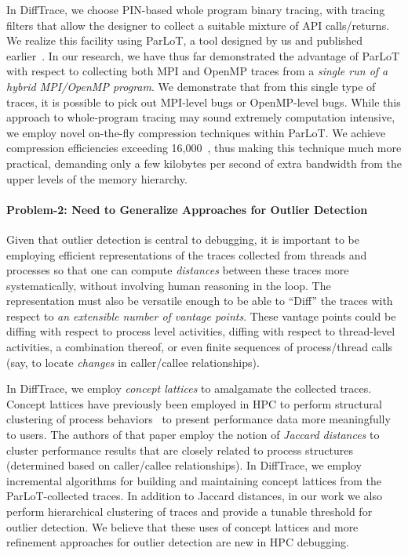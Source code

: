 In DiffTrace, we choose PIN-based whole program binary tracing, with
tracing filters that allow the designer to collect a suitable mixture of API
calls/returns.
%
We realize this facility using
ParLoT, a tool designed by us and published earlier~\cite{parlot-paper}.
%
In our research, we have thus far demonstrated the advantage of
ParLoT with respect to collecting both MPI and OpenMP traces
from a {\em single run of a hybrid MPI/OpenMP program}.
%
We demonstrate that from this single type of traces, it is possible
to pick out MPI-level bugs or OpenMP-level bugs.
%
While this approach to whole-program tracing
may sound extremely computation intensive, we employ
novel on-the-fly compression techniques within ParLoT.
%
We achieve compression efficiencies exceeding 16,000~\cite{parlot-paper},
thus making this technique much more practical, demanding
only a few kilobytes per second of extra bandwidth from the upper levels of
the memory hierarchy.


\paragraph{Problem-2: Need to Generalize Approaches for Outlier Detection\/}
Given that outlier detection is central to debugging,
it is important to be employing efficient representations of the traces
collected from threads and processes so that one can compute
{\em distances} between these traces more systematically, without
involving human reasoning in the loop.
%
The representation must also be versatile enough to
be able to ``Diff'' the traces
with respect to {\em an extensible number of vantage points}.
%
These vantage points could be diffing with respect to process level activities,
diffing with respect to thread-level activities, a combination thereof,
or even finite sequences of process/thread calls (say, to locate {\em changes}
in caller/callee relationships).


In DiffTrace, we employ {\em concept lattices} to amalgamate the collected traces.
%
Concept lattices have previously been employed in HPC to perform structural
clustering of process behaviors~\cite{weber-cl} to present performance data more
meaningfully to users.
%
The authors of that paper employ the notion of {\em Jaccard distances}
to cluster performance results that are closely related to process structures
(determined based on caller/callee relationships).
%
In DiffTrace, we employ incremental algorithms for building and maintaining
concept lattices from the ParLoT-collected traces.
%
In addition to Jaccard distances, in our work we also perform hierarchical
clustering of traces and provide a tunable threshold for outlier detection.
%
We believe that these uses of concept lattices and more refinement approaches
for outlier detection are new in HPC debugging.


